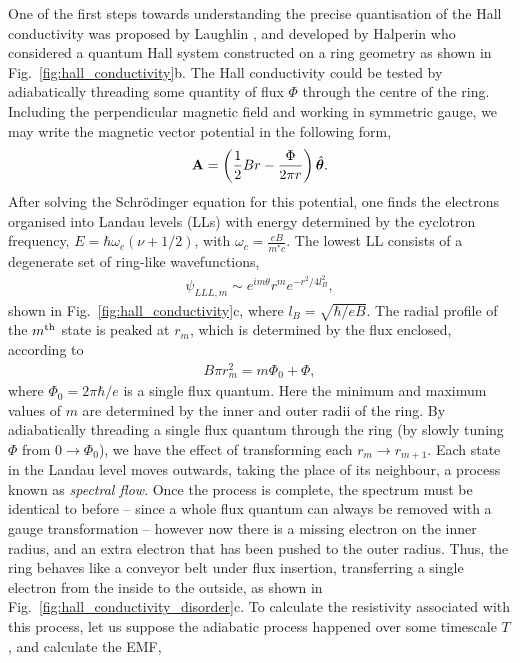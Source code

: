 One of the first steps towards understanding the precise quantisation of the Hall conductivity was proposed by Laughlin \cite{laughlin_quantized_1981}, and developed by Halperin \cite{haplerin_quantized_1982} who considered a quantum Hall system constructed on a ring geometry as shown in Fig.~\ref{fig:hall_conductivity}b. The Hall conductivity could be tested by adiabatically threading some quantity of flux $\Phi$ through the centre of the ring. Including the perpendicular magnetic field and working in symmetric gauge, we may write the magnetic vector potential in the following form,
\begin{align}
    \textbf A = \left ( 
        \frac{1}{2} B r - \frac{\Phi}{2\pi r}    
     \right ) \hat{\bm \theta}.
\end{align}
After solving the Schr\"odinger equation for this potential, one finds the electrons organised into Landau levels (LLs) with energy determined by the cyclotron frequency, $E = \hbar \omega_c(\nu + 1/2)$, with $\omega_c = \frac{eB}{m^*c}$. The lowest LL consists of a degenerate set of ring-like wavefunctions,
\begin{align}
    \psi_{LLL,m} \sim e^{im\theta} r^m e^{-r^2/4l_B^2},
\end{align}
shown in Fig.~\ref{fig:hall_conductivity}c, where $l_B = \sqrt{\hbar/eB}$. The radial profile of the $m^{\textup{th}}$ state is peaked at $r_m$, which is determined by the flux enclosed, according to 
\begin{align}
    B\pi r_m^2 = m \Phi_0 + \Phi,
\end{align}
where $\Phi_0 = 2 \pi \hbar / e$ is a single flux quantum. Here the minimum and maximum values of $m$ are determined by the inner and outer radii of the ring. By adiabatically threading a single flux quantum through the ring (by slowly tuning $\Phi$ from $0 \rightarrow \Phi_0$), we have the effect of transforming each $r_m \rightarrow r_{m+1}$. Each state in the Landau level moves outwards, taking the place of its neighbour, a process known as \textit{spectral flow}. Once the process is complete, the spectrum must be identical to before -- since a whole flux quantum can always be removed with a gauge transformation -- however now there is a missing electron on the inner radius, and an extra electron that has been pushed to the outer radius. Thus, the ring behaves like a conveyor belt under flux insertion, transferring a single electron from the inside to the outside, as shown in Fig.~\ref{fig:hall_conductivity_disorder}c. To calculate the resistivity associated with this process, let us suppose the adiabatic process happened over some timescale $T$, and calculate the EMF,
